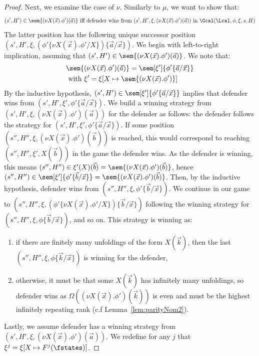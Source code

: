 \begin{proof}
	Next, we examine the case of $\nu$. 
	Similarly to $\mu$, we want to show that:
		\[
	(s', H')\in \sem{(\nu X(\vec x).\phi')(\vec a)} \text{ iff defender wins from }(s', H', \xi, (\nu X(\vec x).\phi')(\vec a))\text{ in }\Gcal(\Lcal, \phi, \xi, s, H)
	\]
	The latter position has the following unique successor position
	$(s', H', \xi, (\phi'\{\nu X(\vec x).\phi'/X\})\{\vec a/\vec x\})$.
	We begin with left-to-right implication, assuming that $(s', H')\in \sem{(\nu X(\vec x).\phi')(\vec a)}$.
	We note that:
	\begin{align*}
		&\sem{(\nu X(\vec x).\phi')(\vec a)} = \sem[\xi']{\phi'\{\vec a / \vec x\}}\\
		&\text{ with } \xi' = \xi[X \mapsto \sem{(\nu X(\vec x).\phi')}]
	\end{align*}
	By the inductive hypothesis, $(s', H') \in \sem[\xi']{\phi'\{\vec a / \vec x\}}$ implies that defender wins from $(s', H', \xi', \phi'\{\vec a / \vec x\})$.
	We build a winning strategy 
	from $(s', H',\xi,(\nu X(\vec x).\phi')(\vec a))$
	for the defender as follows: the defender follows the strategy for $(s', H', \xi', \phi'\{\vec a / \vec x\})$.
	If some position $(s'', H'', \xi, (\nu X(\vec x).\phi')(\vec b))$ is reached, this would correspond to reaching $(s'', H'', \xi', X(\vec b))$ in the game the defender wins. 
	As the defender is winning, this means $(s'', H'')\in \xi'(X)(\vec b) = \sem{(\nu X(\vec x).\phi')(\vec b)}$, hence $(s'', H'')\in \sem[\xi']{\phi'\{\vec b / \vec x\}} = \sem{(\nu X(\vec x).\phi')(\vec b)}$.
	Then, by the inductive hypothesis, defender wins from $(s'', H'', \xi, \phi'\{\vec b / \vec x\})$. 
	We continue in our game to $(s'', H'',\xi, (\phi'\{\nu X(\vec x).\phi'/X\})\{\vec b / \vec x\})$ following the winning strategy for $(s'', H'', \xi, \phi\{\vec b / \vec x\})$, and so on.
	This strategy is winning as:
	\begin{enumerate}
		\item if there are finitely many unfoldings of the form $X(\vec k)$, then the last $(s'', H'', \xi, \phi\{\vec k / \vec x\})$ is winning for the defender,
		\item otherwise, it must be that 
		some $X(\vec k)$ has infinitely many unfoldings, so defender wins as $\Omega((\nu X(\vec x).\phi')(\vec k))$ is even and must be the highest infinitely repeating rank (c.f Lemma~\ref{lem:parityNom2}).
	\end{enumerate}
		Lastly, we assume defender has a winning strategy from $(s', H', \xi, (\nu X(\vec x).\phi')(\vec a))$. 
	We redefine for any $j$ that $\xi^j = \xi[X \mapsto F^j(\fstates)]$.

\end{proof}
